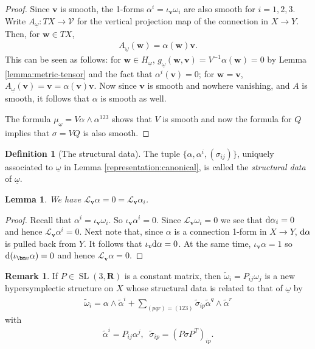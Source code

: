 \documentclass[11pt]{amsart}
\DeclareMathOperator{\SL}{SL}
\def\cL{{\mathcal L}}
\newcommand{\diff}{\text{\rm d}}
\theoremstyle{plain}
\newtheorem{lemma}[theorem]{Lemma}
\theoremstyle{definition}
\newtheorem{definition}[theorem]{Definition}
\newtheorem{remark}[theorem]{Remark}
\theoremstyle{plain}
\theoremstyle{definition}
\numberwithin{equation}{section}
\numberwithin{theorem}{section}
\begin{document}
\begin{proof}
    Since $\bm v$ is smooth, the 1-forms $\alpha^i=\iota_{\bm v}\omega_i$ are also smooth for $i=1,2,3$. Write $A_{\underline\omega} \colon TX \to \mathcal{V}$ for the vertical projection map of the connection in $X \to Y$. Then, for $\bm w\in TX$,
    \begin{align}\label{connection-1-form}
        A_{\underline\omega}\left(\bm w\right)=\alpha\left(\bm w\right)\bm v.
    \end{align}
    This can be seen as follows: for $\bm w\in H_{\underline\omega}$, $g_{\underline\omega}\left(\bm w,\bm v\right)=V^{-1}\alpha\left(\bm w\right)=0$ by Lemma \ref{lemma:metric-tensor} and the fact that $\alpha^i\left(\bm v\right)=0$; for $\bm w=\bm v$, $A_{\underline\omega}\left(\bm v\right)=\bm v=\alpha\left(\bm v\right)\bm v$. Now since ${\bm v}$ is smooth and nowhere vanishing, and $A$ is smooth, it follows that $\alpha$ is smooth as well.

    The formula $\mu_{\underline\omega} = V \alpha \wedge \alpha^{123}$ shows that $V$ is smooth and now the formula for $Q$ implies that $\sigma = VQ$ is also smooth. 
\end{proof}

\begin{definition}[The structural data]
The tuple  $\big\{ \alpha, \alpha^i, \left(\sigma_{ij}\right)\big\}$, uniquely associated to $\underline{\omega}$ in Lemma \ref{representation:canonical}, is called the \emph{structural data} of $\underline\omega$.
\end{definition}

\begin{lemma}\label{alphas-pulled-back}
We have $\cL_{\bm v} \alpha = 0 = \cL_{\bm v} \alpha_i$.
\end{lemma}
\begin{proof}
Recall that $\alpha^i = \iota_{\bm v} \omega_i$. So $\iota_{\bm v} \alpha^i=0$. Since $\cL_{\bm v} \omega_i = 0$ we see that $\diff \alpha_i = 0$ and hence $\cL_{\bm v} \alpha^i = 0$. Next note that, since $\alpha$ is a connection 1-form in $X \to Y$, $\diff \alpha$ is pulled back from $Y$. It follows that $\iota_v \diff \alpha =0$. At the same time, $\iota_{\bm v} \alpha = 1$ so $\diff (\iota_{\bm v} \alpha) =0$ and hence $\cL_{\bm v} \alpha =0$.
\end{proof}

\begin{remark}\label{SL3R-action}
    If $P\in \SL(3,\mathbf{R})$ is a constant matrix, then $\widetilde\omega_i=P_{ij}\omega_j$ is a new hypersymplectic structure on $X$ whose structural data is related to that of $\underline{\omega}$ by 
    \begin{align*}
    \widetilde\omega_i 
    = 
    \alpha\wedge \widetilde\alpha^i 
    + 
    \sum_{(pqr)=(123)} \widetilde\sigma_{ip}\widetilde\alpha^q\wedge \widetilde\alpha^r
    \end{align*}
    with 
    \begin{align*}
    \widetilde\alpha^i 
    = 
    P_{ij}\alpha^j, \;\; 
    \widetilde\sigma_{ip}
    = 
    \left( P\sigma P^T \right)_{ip}.
    \end{align*}
\end{remark}
\end{document}
